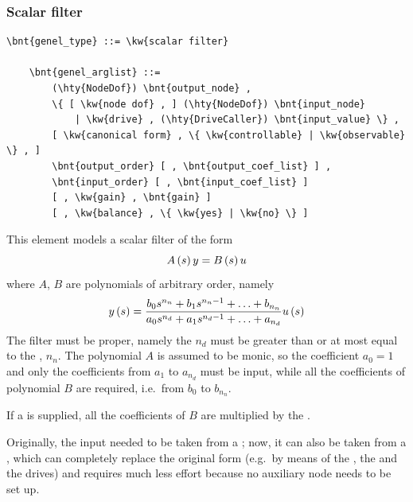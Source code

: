 \subsubsection{Scalar filter}
\label{sec:EL:GENEL:SCALAR-FILTER}
\begin{Verbatim}[commandchars=\\\{\}]
    \bnt{genel_type} ::= \kw{scalar filter}

    \bnt{genel_arglist} ::=
        (\hty{NodeDof}) \bnt{output_node} ,
        \{ [ \kw{node dof} , ] (\hty{NodeDof}) \bnt{input_node}
            | \kw{drive} , (\hty{DriveCaller}) \bnt{input_value} \} ,
        [ \kw{canonical form} , \{ \kw{controllable} | \kw{observable} \} , ]
        \bnt{output_order} [ , \bnt{output_coef_list} ] ,
        \bnt{input_order} [ , \bnt{input_coef_list} ]
        [ , \kw{gain} , \bnt{gain} ]
        [ , \kw{balance} , \{ \kw{yes} | \kw{no} \} ]
\end{Verbatim}
This element models a scalar filter of the form
\begin{displaymath}
    A\left( s \right)y = B\left( s \right)u
\end{displaymath}
where $ A $, $ B $ are polynomials of arbitrary order, namely
\begin{displaymath}
	y\left( s \right) = \frac{
		b_0 s^{n_n}
		+ b_1 s^{n_n-1}
		+ \ldots
		+ b_{n_n}
	}{
		a_0 s^{n_d}
		+ a_1 s^{n_d-1}
		+ \ldots
		+ a_{n_d}
	} u\left( s \right)
\end{displaymath}
The filter must be proper, namely the  $n_d$
must be greater than or at most equal to the , $n_n$.
The polynomial $ A $ is assumed to be monic, so the coefficient 
$a_0=1$ and only the coefficients from $a_1$ to $a_{n_d}$ must be input,
while all the coefficients of polynomial $ B $ are required,
i.e.\ from $b_0$ to $b_{n_n}$.

If a  is supplied, all the coefficients of $ B $
are multiplied by the .

Originally, the input needed to be taken from a ;
now, it can also be taken from a , which can completely replace
the original form (e.g.\ by means of the , the 
and the  drives) and requires much less effort because
no auxiliary node needs to be set up.

